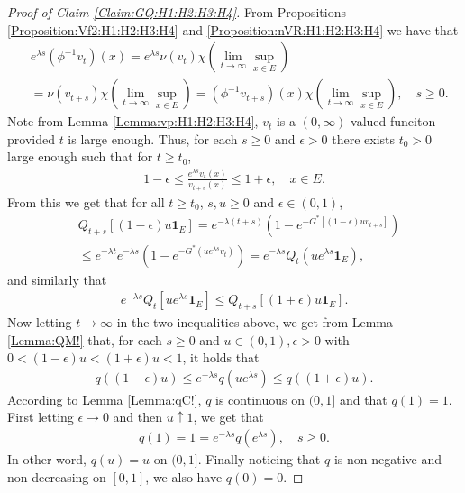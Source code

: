 \documentclass[12pt,a4paper]{amsart}
\numberwithin{equation}{section}
\theoremstyle{plain}
\theoremstyle{definition}
\theoremstyle{remark}
\begin{document}
\begin{proof}[Proof of Claim \ref{Claim:GQ:H1:H2:H3:H4}]
From Propositions
\ref{Proposition:Vf2:H1:H2:H3:H4} and \ref{Proposition:nVR:H1:H2:H3:H4} we have that
\begin{align}
& e^{\lambda s}(\phi^{-1}v_t)(x)
= e^{\lambda s}\nu(v_{t})\chi(\lim_{t\to \infty}\sup_{x\in E})
\\&=\nu(v_{t+s}) \chi(\lim_{t\to \infty}\sup_{x\in E})
= (\phi^{-1}v_{t+s})(x) \chi(\lim_{t\to \infty} \sup_{x\in E}),
\quad s\geq 0. \end{align}
Note from Lemma \ref{Lemma:vp:H1:H2:H3:H4}, $v_t$ is a $(0,\infty)$-valued funciton provided $t$ is large enough.
Thus, for each $s\geq 0$ and $\epsilon >0$ there exists 
$t_0>0$ large enough such that for $t\ge t_0$,
\begin{align}
1-\epsilon
\leq \frac{e^{\lambda s}v_t(x)}{v_{t+s}(x)}
\leq 1+\epsilon,
\quad x\in E.
\end{align}
 From this we get that for all $t\ge t_0$, $s, u\geq 0$ and $\epsilon\in (0, 1)$,
\begin{align}
& Q_{t+s}[ (1-\epsilon)u\mathbf 1_E ]
= e^{-\lambda(t+s)}( 1-e^{-G^*[(1-\epsilon)uv_{t+s}]} )
\\ & \leq e^{-\lambda t} e^{-\lambda s}( 1- e^{-G^*(ue^{\lambda s}v_t)} )
= e^{-\lambda s}Q_t(ue^{\lambda s} \mathbf 1_E),
\end{align}
and similarly that
\begin{align} e^{-\lambda s}Q_t[ue^{\lambda s}\mathbf 1_E]  \leq Q_{t+s}[(1+\epsilon)u\mathbf 1_E]. \end{align}
Now letting $t\to \infty$ in the two inequalities above, 
we get from Lemma \ref{Lemma:QM!} that, 
for each $s\geq 0$ and $u\in (0,1), \epsilon > 0$ with $0 < (1 - \epsilon) u < (1+\epsilon)u < 1$, it holds that
\begin{align}
q((1-\epsilon)u)
\leq e^{-\lambda s}q(u e^{\lambda s})
\leq q((1+\epsilon)u).
\end{align}
According to Lemma \ref{Lemma:qC!}, $q$ is continuous on $(0,1]$ and that $q(1)= 1$.
First letting  $\epsilon \to 0$ and then $u \uparrow 1$, we get that
\begin{align}
q(1)
=1
= e^{- \lambda s} q(e^{\lambda s}),
\quad s \geq 0.
\end{align}
In other word, $q(u) = u$ on $(0,1]$.
Finally noticing that $q$ is non-negative and non-decreasing on $[0,1]$, we also have $q(0) = 0$.
\end{proof}
\end{document}
